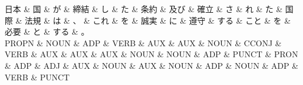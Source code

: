 \documentclass[tikz,border=5pt]{standalone}
\begin{document}
\normalsize
\begin{dependency}[edge unit distance=12.0pt]
    \begin{deptext}[column sep=1em]
        日本 \& 国 \& が \& 締結 \& し \& た \& 条約 \& 及び \& 確立 \& さ \& れ \& た \& 国際 \& 法規 \& は \& 、 \& これ \& を \& 誠実 \& に \& 遵守 \& する \& こと \& を \& 必要 \& と \& する \& 。\\
        PROPN \& NOUN \& ADP \& VERB \& AUX \& AUX \& NOUN \& CCONJ \& VERB \& AUX \& AUX \& AUX \& NOUN \& NOUN \& ADP \& PUNCT \& PRON \& ADP \& ADJ \& AUX \& NOUN \& AUX \& NOUN \& ADP \& NOUN \& ADP \& VERB \& PUNCT\\
    \end{deptext}
\end{dependency}
\end{document}
